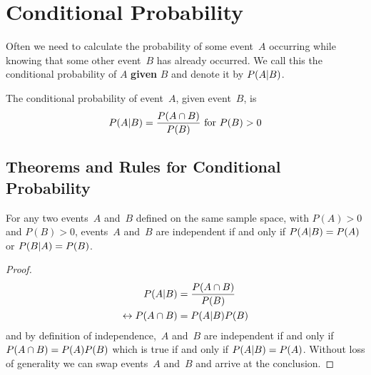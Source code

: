 \chapter{Conditional Probability}
Often we need to calculate the probability of some event~$A$ occurring while knowing that some other event~$B$ has already occurred. We call this the conditional probability of $A$ \textbf{given} $B$ and denote it by $P(A \vert B)$.
\par\smallskip
The conditional probability of event~$A$, given event~$B$, is
\[
    P(A \vert B) = \frac{P(A \cap B)}{P(B)}\text{ for } P(B) > 0
\]
\section{Theorems and Rules for Conditional Probability}
\begin{theorem}
For any two events~$A$ and~$B$ defined on the same sample space, with $P(A) > 0$ and $P(B) > 0$, events~$A$ and~$B$ are independent if and only if $P(A \vert B) = P(A)$ or $P(B \vert A) = P(B)$.
\end{theorem}
\begin{proof}
\begin{align*}
    P(A \vert B) &= \frac{P(A \cap B)}{P(B)} \\
    \leftrightarrow 
    P(A \cap B) &= P(A \vert B)P(B)
\end{align*}
and by definition of independence,~$A$ and~$B$ are independent if and only if $P(A \cap B) = P(A)P(B)$ which is true if and only if $P(A \vert B) = P(A)$. Without loss of generality we can swap events~$A$ and~$B$ and arrive at the conclusion.
\end{proof}
